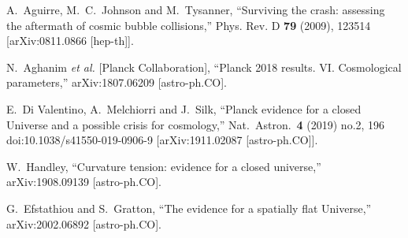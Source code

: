 \documentclass[a4paper,11pt]{article}
\numberwithin{equation}{section}
\begin{document}
\begin{thebibliography}{99}
A.~Aguirre, M.~C.~Johnson and M.~Tysanner,
``Surviving the crash: assessing the aftermath of cosmic bubble collisions,''
Phys. Rev. D \textbf{79} (2009), 123514
[arXiv:0811.0866 [hep-th]].



  N.~Aghanim {\it et al.} [Planck Collaboration],
  ``Planck 2018 results. VI. Cosmological parameters,''
  arXiv:1807.06209 [astro-ph.CO].

  
  E.~Di Valentino, A.~Melchiorri and J.~Silk,
  ``Planck evidence for a closed Universe and a possible crisis for cosmology,''
  Nat.\ Astron.\  {\bf 4} (2019) no.2,  196
  doi:10.1038/s41550-019-0906-9
  [arXiv:1911.02087 [astro-ph.CO]].
 
  W.~Handley,
  ``Curvature tension: evidence for a closed universe,''
  arXiv:1908.09139 [astro-ph.CO].
  
  G.~Efstathiou and S.~Gratton,
  ``The evidence for a spatially flat Universe,''
  arXiv:2002.06892 [astro-ph.CO].


\end{thebibliography}
\end{document}
